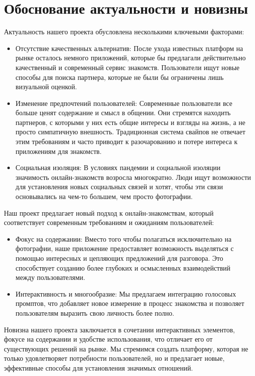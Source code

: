 \section{Обоснование актуальности и новизны}
Актуальность нашего проекта обусловлена несколькими ключевыми факторами:

\begin{itemize}
    \item Отсутствие качественных альтернатив: После ухода известных платформ на рынке осталось немного приложений, которые бы предлагали действительно качественный и современный сервис знакомств. Пользователи ищут новые способы для поиска партнера, которые не были бы ограничены лишь визуальной оценкой.
    \item Изменение предпочтений пользователей: Современные пользователи все больше ценят содержание и смысл в общении. Они стремятся находить партнеров, с которыми у них есть общие интересы и взгляды на жизнь, а не просто симпатичную внешность. Традиционная система свайпов не отвечает этим требованиям и часто приводит к разочарованию и потере интереса к приложениям для знакомств.
    \item Социальная изоляция: В условиях пандемии и социальной изоляции значимость онлайн-знакомств возросла многократно. Люди ищут возможности для установления новых социальных связей и хотят, чтобы эти связи основывались на чем-то большем, чем просто фотографии.
\end{itemize}



Наш проект предлагает новый подход к онлайн-знакомствам, который соответствует современным требованиям и ожиданиям пользователей:

\begin{itemize}
    \item Фокус на содержании: Вместо того чтобы полагаться исключительно на фотографии, наше приложение предоставляет возможность выделяться с помощью интересных и цепляющих предложений для разговора. Это способствует созданию более глубоких и осмысленных взаимодействий между пользователями.
    \item Интерактивность и многообразие: Мы предлагаем интеграцию голосовых промптов, что добавляет новое измерение в процесс знакомства и позволяет пользователям выразить свою личность более полно.
\end{itemize}


Новизна нашего проекта заключается в сочетании интерактивных элементов, фокусе на содержании и удобстве использования, что отличает его от существующих решений на рынке. Мы стремимся создать платформу, которая не только удовлетворяет потребности пользователей, но и предлагает новые, эффективные способы для установления значимых отношений.




